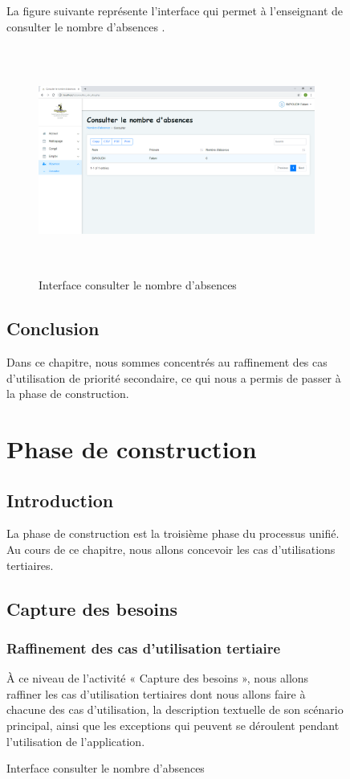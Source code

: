 \documentclass[12 pt]{report}
\begin{document}
\begin{figure}[h]
\begin{center}
\begin{figure}[h]
\begin{center}
\end{center}
\end{figure}
La figure suivante représente l'interface qui permet à l'enseignant de consulter le nombre d'absences .

\begin{figure}[h]
 \begin{center}
\includegraphics[width= 18 cm ,height=  7.5cm]{consulter_nbr_abs.PNG}
\caption{Interface consulter le nombre d'absences }

\end{center}
\end{figure}
\section*{Conclusion}  
Dans ce chapitre, nous sommes concentrés au raffinement des cas d'utilisation de priorité secondaire, ce qui nous a permis de passer à la phase de construction.
\chapter{Phase de construction}
\section*{Introduction}  
La phase de construction est la troisième phase du processus unifié. Au cours de ce chapitre, nous allons concevoir les cas d’utilisations tertiaires.
\section{Capture des besoins}
\subsection{Raffinement des cas d’utilisation tertiaire}
À ce niveau de l’activité « Capture des besoins », nous allons raffiner les cas d'utilisation tertiaires dont nous allons faire à chacune des cas d'utilisation, la description textuelle de son scénario principal, ainsi que les exceptions qui peuvent se déroulent pendant l'utilisation de l’application.

\end{center}
\end{figure}
\end{document}

